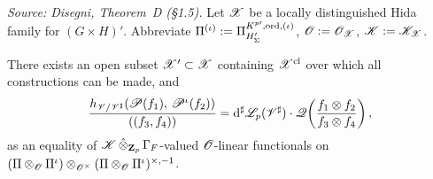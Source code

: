 \begin{theorem}
  \label{thm:TheoremD}
%
  \textit{Source: Disegni, Theorem~D (§1.5).}
  Let $\mathscr{X}$ be a locally distinguished Hida family for $(G \times H)'$.
  Abbreviate $\Pi^{(\iota)} := \Pi^{K^{p\prime},\mathrm{ord},(\iota)}_{H'_\Sigma}$,
  $\mathscr{O} := \mathscr{O}_{\mathscr{X}}$, $\mathscr{K} := \mathscr{K}_{\mathscr{X}}$.

  There exists an open subset $\mathscr{X}' \subset \mathscr{X}$ containing
  $\mathscr{X}^{\mathrm{cl}}$ over which all constructions can be made, and
  \[
    \frac{h_{\mathscr{V}/\mathscr{V}^\sharp}(\mathscr{P}(f_1),\, \mathscr{P}^\iota(f_2))}{((f_3, f_4))}
    =
    \mathrm{d}^\sharp \mathscr{L}_p(\mathscr{V}^\sharp) \cdot
    \mathscr{Q}\!\left(\frac{f_1 \otimes f_2}{f_3 \otimes f_4}\right),
  \]
  as an equality of $\mathscr{K}\,\hat\otimes_{\mathbf{Z}_p}\,\Gamma_F$-valued
  $\mathscr{O}$-linear functionals on
  $(\Pi \otimes_{\mathscr{O}} \Pi^\iota) \otimes_{\mathscr{O}^\times}
  (\Pi \otimes_{\mathscr{O}} \Pi^\iota)^{\times,-1}$.
\end{theorem}

